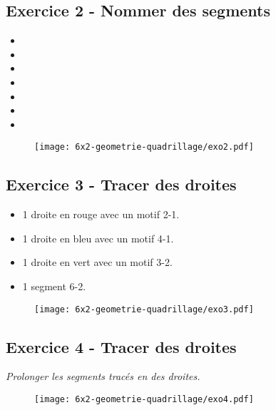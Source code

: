 \begin{minipage}[t]{0.25\textwidth}
  \subsection*{Exercice 2 - Nommer des segments}
  \begin{itemize}
    \item \dotfill
    \item \dotfill
    \item \dotfill
    \item \dotfill
    \item \dotfill
    \item \dotfill
    \item \dotfill
  \end{itemize}
  \end{minipage}
  \begin{minipage}[t]{0.75\textwidth}
\begin{figure}[H]
  \centering
  \texttt{[image: 6x2-geometrie-quadrillage/exo2.pdf]}
\end{figure}
\end{minipage}




\begin{minipage}[t]{0.25\textwidth}
\subsection*{Exercice 3 - Tracer des droites}
\begin{itemize}
  \item 1 droite en rouge avec un motif 2-1.
  \item 1 droite en bleu avec un motif 4-1.
  \item 1 droite en vert avec un motif 3-2.
  \item 1 segment 6-2.
\end{itemize}
\end{minipage}
\begin{minipage}[t]{0.75\textwidth}
  \begin{figure}[H]
    \centering
    \texttt{[image: 6x2-geometrie-quadrillage/exo3.pdf]}
  \end{figure}
\end{minipage}

\begin{minipage}[t]{0.25\textwidth}
\subsection*{Exercice 4 - Tracer des droites}

\textit{Prolonger les segments tracés en des droites.}
\end{minipage}
\begin{minipage}[t]{0.75\textwidth}
\begin{figure}[H]
  \centering
  \texttt{[image: 6x2-geometrie-quadrillage/exo4.pdf]}
\end{figure}
\end{minipage}
